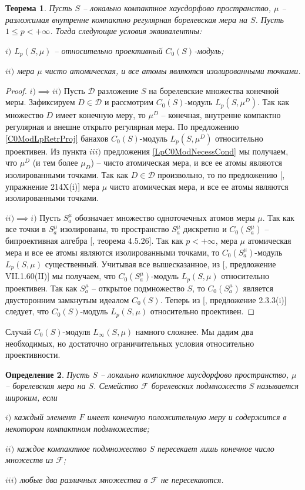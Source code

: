 \documentclass[12pt]{article}
\newtheorem{theorem}{Теорема}[section]
\newtheorem{definition}[theorem]{Определение}
\begin{document}
\begin{theorem}\label{ReflLpC0ModCrit} Пусть $S$ -- локально компактное хаусдорфово пространство, $\mu$ -- разложимая внутренне компактно регулярная борелевская мера на $S$. Пусть $1\leq p< +\infty$. Тогда следующие условия эквивалентны:

    $i)$ $L_p(S,\mu)$ -- относительно проективный $C_0(S)$-модуль;

    $ii)$ мера $\mu$ чисто атомическая, и все атомы являются изолированными точками.
\end{theorem}
\begin{proof} $i)\implies ii)$ Пусть $\mathcal{D}$ разложение $S$ на борелевские множества конечной меры. Зафиксируем $D\in\mathcal{D}$ и рассмотрим $C_0(S)$-модуль $L_p(S,\mu^D)$. Так как множество $D$ имеет конечную меру, то $\mu^D$ -- конечная, внутренне компактно регулярная и внешне открыто регулярная мера. По предложению \ref{C0ModLpRetrProj} банахов $C_0(S)$-модуль $L_p(S,\mu^D)$ относительно проективен. Из пункта $iii)$ предложения \ref{LpC0ModNecessCond} мы получаем, что $\mu^D$ (и тем более $\mu_D$) -- чисто атомическая мера, и все ее атомы являются изолированными точками. Так как $D\in\mathcal{D}$ произвольно, то по предложению [\cite{FremMeasTh2}, упражнение 214X(i)] мера $\mu$ чисто атомическая мера, и все ее атомы являются изолированными точками.

    $ii)\implies i)$ Пусть $S_a^\mu$ обозначает множество одноточечных атомов меры $\mu$. Так как все точки в $S_a^\mu$ изолированы, то пространство $S_a^\mu$ дискретно и $C_0(S_a^\mu)$ -- бипроективная алгебра [\cite{HelHomolBanTopAlg}, теорема 4.5.26]. Так как $p<+\infty$, мера $\mu$  атомическая мера и все ее атомы являются изолированными точками, то $C_0(S_a^\mu)$-модуль $L_p(S,\mu)$ существенный. Учитывая все вышесказанное, из [\cite{HelBanLocConvAlg}, предложение VII.1.60(II)] мы получаем, что $C_0(S_a^\mu)$-модуль $L_p(S,\mu)$ относительно проективен. Так как $S_a^\mu$ -- открытое подмножество $S$, то $C_0(S_a^\mu)$ является двусторонним замкнутым идеалом  $C_0(S)$. Теперь из [\cite{RamsHomPropSemgroupAlg}, предложение 2.3.3(i)] следует, что $C_0(S)$-модуль $L_p(S,\mu)$ относительно проективен.
\end{proof}

Случай $C_0(S)$-модуля $L_\infty(S,\mu)$ намного сложнее. Мы дадим два необходимых, но достаточно ограничительных условия относительно проективности.

\begin{definition}\label{WideFamilyDef} Пусть $S$ -- локально компактное хаусдорфово пространство, $\mu$ -- борелевская мера на $S$. Семейство $\mathcal{F}$ борелевских подмножеств $S$ называется широким, если

    $i)$ каждый элемент $F$ имеет конечную положительную меру и содержится в некотором компактном подмножестве;

    $ii)$ каждое компактное подмножество $S$ пересекает лишь конечное число множеств из $\mathcal{F}$;

    $iii)$ любые два различных множества в $\mathcal{F}$ не пересекаются.
\end{definition}
\end{document}
